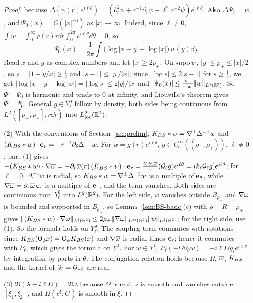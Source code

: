 \begin{proof}
because $\Delta(\psi(r)e^{i\ell\theta})=(\partial_r^2\psi+r^{-1}\partial_r\psi-\ell^2r^{-2}\psi)e^{i\ell\theta}$.
Also $\Delta\Psi_0=w$, and $\Psi_0(x)=O(|x|^{-1})$ as $|x|\to\infty$. Indeed,
since $\ell\ne0$,
$\int w=\int_0^\infty g(r)r\dd r\int_0^{2\pi}e^{i\ell\theta}\dd\theta=0$, so
\[
\Psi_0(x)=\frac1{2\pi}\int\big(\log|x-y|-\log|x|\big)\,w(y)\dd y .
\]
Read $x$ and $y$ as complex numbers and let $|x|\ge2\rho_+$. On $\operatorname{supp} w$,
$|y|\le\rho_+\le|x|/2$, so $s=|1-y/x|\ge\frac12$ and $|s-1|\le|y|/|x|$; since
$|\log s|\le2|s-1|$ for $s\ge\frac12$, we get
$|\log|x-y|-\log|x||=|\log s|\le2|y|/|x|$ and
$|\Psi_0(x)|\le\frac{\rho_+}{\pi|x|}\|w\|_{L^1(\mathbb{R}^2)}$. So $\Psi-\Psi_0$ is harmonic and tends to $0$ at infinity, and Liouville's theorem
gives $\Psi=\Psi_0$. General $g\in Y^0_\ell$ follow by density, both sides being
continuous from $L^2([\rho_-,\rho_+],r\dd r)$ into $L^2_{\rm loc}(\mathbb{R}^2)$.

(2) With the conventions of Section~\ref{sec:prelim},
$K_{BS}\ast w=\nabla^\perp\Delta^{-1}w$ and $(K_{BS}\ast w)\cdot\textbf{e}_r=-r^{-1}\partial_\theta\Delta^{-1}w$.
For $w=g(r)e^{i\ell\theta}$, $g\in C_c^\infty((\rho_-,\rho_+))$, $\ell\ne0$, part
(1) gives
$-(K_{BS}\ast w)\cdot\nabla\overline{\omega}=-\partial_r\overline{\omega}(r)\,(K_{BS}\ast w)\cdot\textbf{e}_r
=\frac{i\ell\,\partial_r\overline{\omega}}{r}(\mathcal{G}_\ell g)e^{i\ell\theta}=(k_\ell\mathcal{G}_\ell g)e^{i\ell\theta}$;
for $\ell=0$, $\Delta^{-1}w$ is radial, so $K_{BS}\ast w=\nabla^\perp\Delta^{-1}w$
is a multiple of $\textbf{e}_\theta$, while $\nabla\overline{\omega}=\partial_r\overline{\omega}\,\textbf{e}_r$ is a multiple of $\textbf{e}_r$,
and the term vanishes. Both sides are
continuous from $Y^0_\ell$ into $L^2(\mathbb{R}^2)$. For the left side, $w$ vanishes outside
$B_{\rho_+}$ and $\nabla\overline{\omega}$ is bounded and supported in $B_{\rho_+}$, so
Lemma~\ref{lem:BS-basic}(c) with $\rho=R=\rho_+$ gives
$\|(K_{BS}\ast w)\cdot\nabla\overline{\omega}\|_{L^2(\mathbb{R}^2)}\le2\rho_+\|\nabla\overline{\omega}\|_{L^\infty(\mathbb{R}^2)}\|w\|_{L^2(\mathbb{R}^2)}$;
for the right side, use (1). So the formula holds on $Y^0_\ell$. The coupling term commutes with rotations, since
$K_{BS}(\mathsf{O}_\phi x)=\mathsf{O}_\phi K_{BS}(x)$ and $\nabla\overline{\omega}$ is radial times $\textbf{e}_r$;
hence it commutes with $P_\ell$, which gives the formula on $Y^0$. For $w\in Y^1$,
$P_\ell(-\Omega\partial_\theta w)=-i\ell\Omega g_\ell e^{i\ell\theta}$ by
integration by parts in $\theta$. The conjugation relation holds
because $\Omega$, $\overline{\omega}$, $K_{BS}$ and the kernel of $\mathcal{G}_\ell=\mathcal{G}_{-\ell}$ are
real.

(3) $\Re(\lambda+i\ell\Omega)=\Re\lambda$ because $\Omega$ is real; $\nu$ is smooth
and vanishes outside $[\xi_1,\xi_2]$, and $\Omega(e^\xi;G)$ is smooth in $\xi$.


\end{proof}
